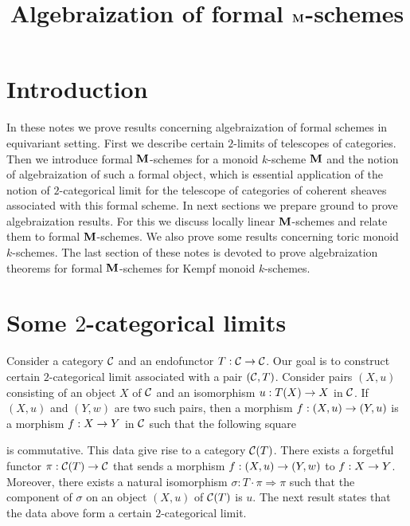 

\usepackage{todonotes}
\newcommand{\lstodo}[1]{\todo[color=green!40,bordercolor=green,size=\footnotesize]{\textbf{LS TODO: }#1}}



\title{Algebraization of formal $\mathbf{M}$-schemes}
\date{}
\maketitle

\section{Introduction}
\noindent
In these notes we prove results concerning algebraization of formal schemes in equivariant setting. First we describe certain $2$-limits of telescopes of categories. Then we introduce formal $\mathbf{M}$-schemes for a monoid $k$-scheme $\mathbf{M}$ and the notion of algebraization of such a formal object, which is essential application of the notion of $2$-categorical limit for the telescope of categories of coherent sheaves associated with this formal scheme. In next sections we prepare ground to prove algebraization results. For this we discuss locally linear $\mathbf{M}$-schemes and relate them to formal $\mathbf{M}$-schemes. We also prove some results concerning toric monoid $k$-schemes. The last section of these notes is devoted to prove algebraization theorems for formal $\mathbf{M}$-schemes for Kempf monoid $k$-schemes. 

\section{Some $2$-categorical limits}
\noindent
Consider a category ${\mathcal C}$ and an endofunctor $T:{\mathcal C}\rightarrow {\mathcal C}$. Our goal is to construct certain $2$-categorical limit associated with a pair $({\mathcal C},T)$. Consider pairs $\left(X,u\right)$ consisting of an object $X$ of ${\mathcal C}$ and an isomorphism $u:T(X)\rightarrow X$ in ${\mathcal C}$. If $\left(X,u\right)$ and $\left(Y,w\right)$ are two such pairs, then a morphism $f:(X,u) \rightarrow (Y,u)$ is a morphism $f:X\rightarrow Y$ in ${\mathcal C}$ such that the following square
\begin{center}
\end{center}
is commutative. This data give rise to a category ${\mathcal C}(T)$. There exists a forgetful functor $\pi:{\mathcal C}(T)\rightarrow {\mathcal C}$ that sends a morphism $f:(X,u)\rightarrow (Y,w)$ to $f:X\rightarrow Y$. Moreover, there exists a natural isomorphism $\sigma:T\cdot \pi \Rightarrow \pi$ such that the component of $\sigma$ on an object $(X,u)$ of ${\mathcal C}(T)$ is $u$. The next result states that the data above form a certain $2$-categorical limit.

